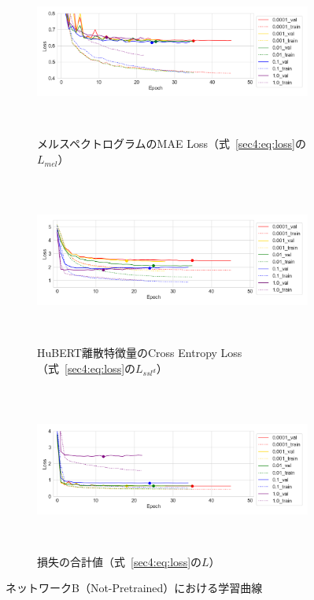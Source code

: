 \documentclass[12pt]{jarticle}
\numberwithin{equation}{section}    %
\numberwithin{figure}{section}      %
\numberwithin{table}{section}      %
\begin{document}
\begin{figure}[bt]
    \centering
    \begin{subfigure}{\linewidth}
        \centering
        \includegraphics[height=55mm]{./figure/sec4/learning_curves/2/mel_loss.png}
        \caption{メルスペクトログラムのMAE Loss（式~\eqref{sec4:eq:loss}の$L_{mel}$）}
        \label{sec4:fig:learning_curve_method_2_val_mel_loss}
    \end{subfigure}
    \begin{subfigure}{\linewidth}
        \centering
        \includegraphics[height=55mm]{./figure/sec4/learning_curves/2/ssl_feature_cluster_loss.png}
        \caption{HuBERT離散特徴量のCross Entropy Loss（式~\eqref{sec4:eq:loss}の$L_{ssl^{d}}$）}
        \label{sec4:fig:learning_curve_method_2_val_ssl_feature_cluster_loss}
    \end{subfigure}
    \begin{subfigure}{\linewidth}
        \centering
        \includegraphics[height=55mm]{./figure/sec4/learning_curves/2/total_loss.png}
        \caption{損失の合計値（式~\eqref{sec4:eq:loss}の$L$）}
        \label{sec4:fig:learning_curve_method_2_val_total_loss}
    \end{subfigure}
    \caption{ネットワークB（Not-Pretrained）における学習曲線}
    \label{sec4:fig:learning_curve_method_2_val_losses}
\end{figure}
\end{document}
